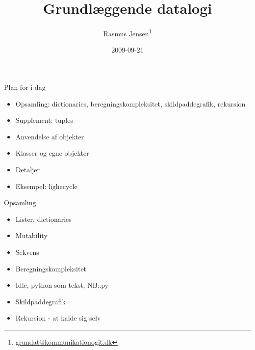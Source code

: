 \documentclass[a4paper,landscape]{slides}
\title{Grundlæggende datalogi}
\author{Rasmus Jensen\footnote{\url{grundat@kommunikationogit.dk}}}
\date{2009-09-21}
\begin{document}
\maketitle

\begin{comment}
- Opsamling
  - Lister, dictionaries, sekvenser
  - Skildpaddegrafik
  - NB: tupler
  - Øvelse: n-kant - rekursivt og iterativt
  - Øvelse: Sierpinski trekant
  - Øvelse: polygonspiral

- Objekter
  - Skildpadder og skildpaddegrafik
  - Filer
  - Objekter
  - Hvad er et objekt
  - metoder og properties
  - funktionalitet koblet til data
  - Øvelse: Program der læser en fil med tegneinstruktioner og tegner den

- Deklaration af objekter
  - Modellering
  - Øvelse: quiz-objekt
  - Øvelse: familietræ - NB: overvej hvordan I ville implementerer ancestor-funktion

- Hvordan objekter virker
  - \verb|__dict__|, \verb|__class__|

- Eksempel: LightCycle
  - Beskrivelse af opgaven

- Mere om objekter:
  - Nedarvning, \verb|__bases__|
  - Interfaces og duck-typing
  - Lookup-regler
 
\end{comment}

\begin{slide}
	\begin{center} {\large 
            Plan for i dag
	} \end{center}
	\begin{itemize} \addtolength{\itemsep}{-\baselineskip}
		\item Opsamling: dictionaries, beregningskompleksitet, skildpaddegrafik, rekursion
		\item Supplement: tuples
                \item Anvendelse af objekter
		\item Klasser og egne objekter
		\item Detaljer
                \item Eksempel: lighecycle
	\end{itemize}
\end{slide}

\begin{slide}
	\begin{center} {\large 
            Opsamling
	} \end{center}
	\begin{itemize} \addtolength{\itemsep}{-\baselineskip}
                \item Lister, dictionaries
                \item Mutability
                \item Sekvens
                \item Beregningskompleksitet
                \item Idle, python som tekst, NB:.py
                \item Skildpaddegrafik
                \item Rekursion - at kalde sig selv
	\end{itemize}
\end{slide}
\end{document}
